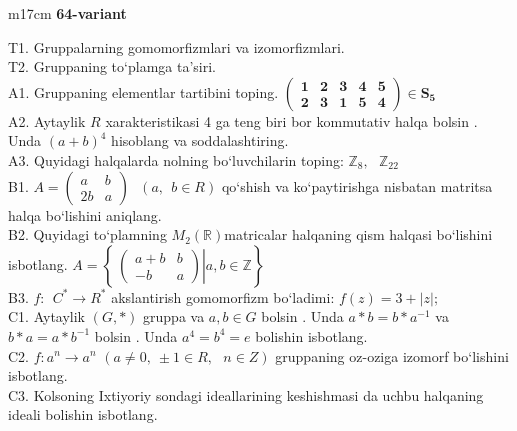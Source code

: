 \documentclass{article}
\begin{document}
\begin{tabular}{m{17cm}}
\textbf{64-variant}
\newline

T1. Gruppalarning gomomorfizmlari va izomorfizmlari. \\
T2. Gruppaning to`plamga ta'siri. \\
A1. Gruppaning elementlar tartibini toping. \(\begin{pmatrix}
\mathbf{1} & \mathbf{2} & \mathbf{3} & \mathbf{4} & \mathbf{5} \\
\mathbf{2} & \mathbf{3} & \mathbf{1} & \mathbf{5} & \mathbf{4}
\end{pmatrix}\mathbf{\in}\mathbf{S}_{\mathbf{5}}\) \\
A2. Aytaylik \(R\) xarakteristikasi 4 ga teng biri bor kommutativ halqa bo\textquotesingle lsin . Unda \((a + b)^{4}\) hisoblang va soddalashtiring. \\
A3. Quyidagi halqalarda nolning bo`luvchilarin toping: \(\mathbb{Z}_{8},\ \ \ \mathbb{Z}_{22}\) \\
B1. \(A = \begin{pmatrix}
a & b \\
2b & a
\end{pmatrix}\ \ \ (a,\ \ b \in R)\) qo`shish va ko`paytirishga nisbatan matritsa halqa bo`lishini aniqlang. \\
B2. Quyidagi to`plamning \(M_{2}(\mathbb{R})\)matricalar halqaning qism halqasi bo`lishini isbotlang. \(A = \left\{ \left. \ \begin{pmatrix}
a + b & b \\
 - b & a
\end{pmatrix} \right|a,b\mathbb{\in Z} \right\}\) \\
B3. \(f:\ \ C^{*} \rightarrow R^{*}\) akslantirish gomomorfizm bo`ladimi: \(f(z) = 3 + |z|;\) \\
C1. Aytaylik \((G,*)\) gruppa va \(a,b \in G\) bo\textquotesingle lsin . Unda \(a*b = b*a^{- 1}\) va \(b*a = a*b^{- 1}\) bo\textquotesingle lsin . Unda \(a^{4} = b^{4} = e\) bolishin isbotlang. \\
C2. \(f:a^{n} \rightarrow a^{n}\) \((a \neq 0,\  \pm 1 \in R,\ \ \ n \in Z)\) gruppaning o\textquotesingle z-o\textquotesingle ziga izomorf bo`lishini isbotlang. \\
C3. Kolsoning Ixtiyoriy sondagi ideallarining keshishmasi da uchbu halqaning ideali bo\textquotesingle lishin isbotlang. \\

\end{tabular}
\vspace{1cm}
\end{document}
